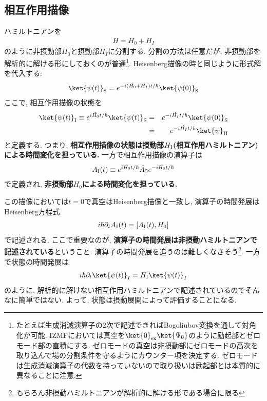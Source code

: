 \documentclass[10.5pt,a4paper]{jreport}
\begin{document}
\subsection{相互作用描像}
ハミルトニアンを
\begin{eqnarray}
  H = H_0 + H_I
\end{eqnarray}
のように非摂動部$H_0$と摂動部$H_I$に分割する. 分割の方法は任意だが, 非摂動部を解析的に解ける形にしておくのが普通\footnote{たとえば生成消滅演算子の2次で記述できればBogoliubov変換を通して対角化が可能. IZMFにおいては真空を$\ket{0}_{\rm ex}\ket{\Psi_0}$のように励起部とゼロモード部の直積にする. ゼロモードの真空は非摂動部にゼロモードの高次を取り込んで場の分割条件を守るようにカウンター項を決定する. ゼロモードは生成消滅演算子の代数を持っていないので取り扱いは励起部とは本質的に異なることに注意. }. Heisenberg描像の時と同じように形式解を代入する:
\begin{eqnarray}
  \ket{\psi(t)}_{\rm S} = e^{-i(\hat{H_0} + \hat{H_I})t/\hbar}\ket{\psi(0)}_{\rm S}
\end{eqnarray}
ここで, 相互作用描像の状態を
\begin{eqnarray}
  \ket{\psi(t)}_{\rm I} \equiv e^{i\hat{H_0}t/\hbar}\ket{\psi(t)}_{\rm S} &=& e^{-i\hat{H_I}t/\hbar}\ket{\psi(0)}_{\rm S}\\
  &=& e^{-i\hat{H_I}t/\hbar}\ket{\psi}_{\rm H}
\end{eqnarray}
と定義する. つまり, \textbf{相互作用描像の状態は摂動部$H_{\rm I}$(相互作用ハミルトニアン)による時間変化を担っている. }一方で相互作用描像の演算子は
\begin{eqnarray}
  A_{\rm I}(t) \equiv e^{i\hat{H_0}t/\hbar}\hat{A}_{\rm S}e^{-i\hat{H_0}t/\hbar}
\end{eqnarray}
で定義され, \textbf{非摂動部$H_0$による時間変化を担っている. }

この描像においては$t = 0$で真空はHeisenberg描像と一致し, 演算子の時間発展はHeisenberg方程式
\begin{eqnarray}
  i\hbar\partial_tA_{\rm I}(t) = [A_{\rm I}(t), H_0]
\end{eqnarray}
で記述される. ここで重要なのが, \textbf{演算子の時間発展は非摂動ハミルトニアンで記述されている}ということ. 演算子の時間発展を追うのは難しくなさそう\footnote{もちろん非摂動ハミルトニアンが解析的に解ける形である場合に限る}. 一方で状態の時間発展は
\begin{eqnarray}
  i\hbar\partial_t\ket{\psi(t)}_I = H_{\rm I}\ket{\psi(t)}_I
\end{eqnarray}
のように, 解析的に解けない相互作用ハミルトニアンで記述されているのでそんなに簡単ではない. よって, 状態は摂動展開によって評価することになる.
\end{document}
